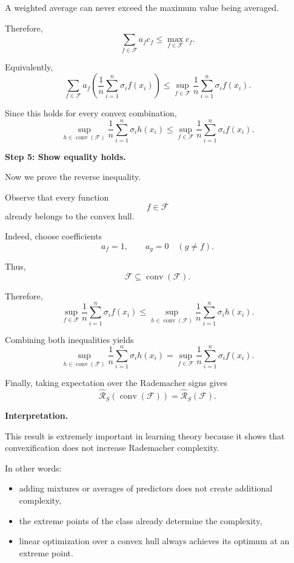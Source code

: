 \documentclass[11pt]{article}
\begin{document}
\begin{enumerate}
\begin{solutionbox}
A weighted average can never exceed the maximum value being averaged.

Therefore,
\[
\sum_{f\in\mathcal F}a_fc_f
\le
\max_{f\in\mathcal F}c_f.
\]

Equivalently,
\[
\sum_{f\in\mathcal F}
a_f
\left(
\frac1n
\sum_{i=1}^n
\sigma_if(x_i)
\right)
\le
\sup_{f\in\mathcal F}
\frac1n
\sum_{i=1}^n
\sigma_if(x_i).
\]

Since this holds for every convex combination,
\[
\sup_{h\in\operatorname{conv}(\mathcal F)}
\frac1n
\sum_{i=1}^n
\sigma_ih(x_i)
\le
\sup_{f\in\mathcal F}
\frac1n
\sum_{i=1}^n
\sigma_if(x_i).
\]

\medskip

\textbf{Step 5: Show equality holds.}

Now we prove the reverse inequality.

Observe that every function
\[
f\in\mathcal F
\]
already belongs to the convex hull.

Indeed, choose coefficients
\[
a_f=1,
\qquad
a_g=0
\quad
(g\neq f).
\]

Thus,
\[
\mathcal F
\subseteq
\operatorname{conv}(\mathcal F).
\]

Therefore,
\[
\sup_{f\in\mathcal F}
\frac1n
\sum_{i=1}^n
\sigma_if(x_i)
\le
\sup_{h\in\operatorname{conv}(\mathcal F)}
\frac1n
\sum_{i=1}^n
\sigma_ih(x_i).
\]

Combining both inequalities yields
\[
\sup_{h\in\operatorname{conv}(\mathcal F)}
\frac1n
\sum_{i=1}^n
\sigma_ih(x_i)
=
\sup_{f\in\mathcal F}
\frac1n
\sum_{i=1}^n
\sigma_if(x_i).
\]

Finally, taking expectation over the Rademacher signs gives
\[
\boxed{
\widehat{\mathcal R}_S(\operatorname{conv}(\mathcal F))
=
\widehat{\mathcal R}_S(\mathcal F).
}
\]

\medskip

\textbf{Interpretation.}

This result is extremely important in learning theory because it shows that convexification does not increase Rademacher complexity.

In other words:
\begin{itemize}
    \item adding mixtures or averages of predictors does not create additional complexity,
    \item the extreme points of the class already determine the complexity,
    \item linear optimization over a convex hull always achieves its optimum at an extreme point.
\end{itemize}


\end{solutionbox}
\end{enumerate}
\end{document}
